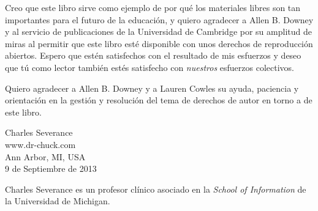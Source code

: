 Creo que este libro sirve como ejemplo de por qué los materiales libres
son tan importantes para el futuro de la educación,
y quiero agradecer a Allen B. Downey y al servicio de publicaciones de
la Universidad de Cambridge por su amplitud de miras al permitir
que este libro esté disponible con unos derechos de reproducción abiertos.
Espero que estén satisfechos con el resultado de mis esfuerzos y deseo
que tú como lector también estés satisfecho con \emph{nuestros}
esfuerzos colectivos.

Quiero agradecer a Allen B. Downey y a Lauren Cowles su ayuda,
paciencia y orientación en la gestión y resolución del tema
de derechos de autor en torno a de este libro.

Charles Severance\\
www.dr-chuck.com\\
Ann Arbor, MI, USA\\
9 de Septiembre de 2013

Charles Severance es un
profesor clínico asociado
en la \emph{School of Information} de la Universidad de Michigan.

\clearemptydoublepage

\begin{latexonly}

\tableofcontents

\clearemptydoublepage

\end{latexonly}

\mainmatter

